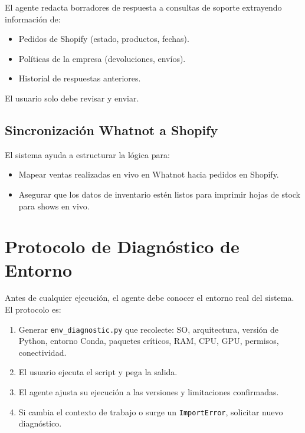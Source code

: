 \documentclass[a4paper,12pt]{article}
\begin{document}
El agente redacta borradores de respuesta a consultas de soporte extrayendo información de:

\begin{itemize}
    \item Pedidos de Shopify (estado, productos, fechas).
    \item Políticas de la empresa (devoluciones, envíos).
    \item Historial de respuestas anteriores.
\end{itemize}

El usuario solo debe revisar y enviar.

\subsection{Sincronización Whatnot a Shopify}

El sistema ayuda a estructurar la lógica para:

\begin{itemize}
    \item Mapear ventas realizadas en vivo en Whatnot hacia pedidos en Shopify.
    \item Asegurar que los datos de inventario estén listos para imprimir hojas de stock para shows en vivo.
\end{itemize}

\section{Protocolo de Diagnóstico de Entorno}

Antes de cualquier ejecución, el agente debe conocer el entorno real del sistema. El protocolo es:

\begin{enumerate}
    \item Generar \texttt{env\_diagnostic.py} que recolecte: SO, arquitectura, versión de Python, entorno Conda, paquetes críticos, RAM, CPU, GPU, permisos, conectividad.
    \item El usuario ejecuta el script y pega la salida.
    \item El agente ajusta su ejecución a las versiones y limitaciones confirmadas.
    \item Si cambia el contexto de trabajo o surge un \texttt{ImportError}, solicitar nuevo diagnóstico.
\end{enumerate}
\end{document}
